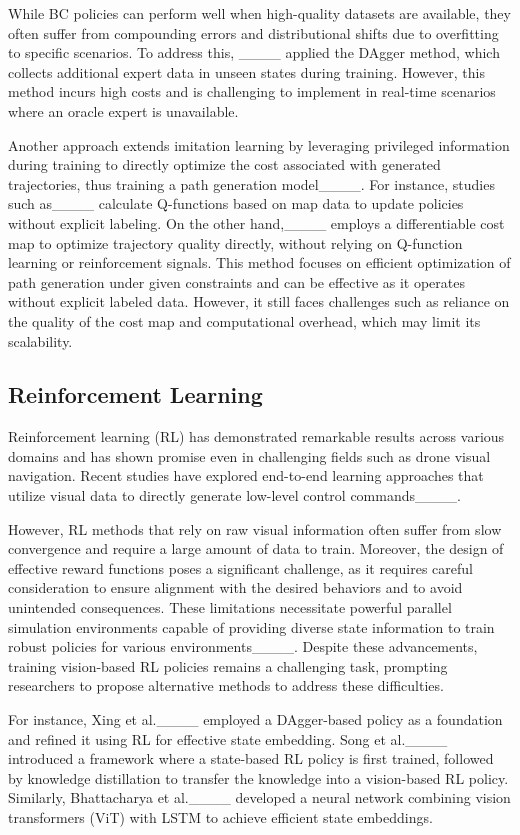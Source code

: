 While BC policies can perform well when high-quality datasets are available, they often suffer from compounding errors and distributional shifts due to overfitting to specific scenarios. To address this, ____ applied the DAgger method, which collects additional expert data in unseen states during training. However, this method incurs high costs and is challenging to implement in real-time scenarios where an oracle expert is unavailable.

Another approach extends imitation learning by leveraging privileged information during training to directly optimize the cost associated with generated trajectories, thus training a path generation model____. For instance, studies such as____ calculate Q-functions based on map data to update policies without explicit labeling. On the other hand,____ employs a differentiable cost map to optimize trajectory quality directly, without relying on Q-function learning or reinforcement signals. This method focuses on efficient optimization of path generation under given constraints and can be effective as it operates without explicit labeled data. However, it still faces challenges such as reliance on the quality of the cost map and computational overhead, which may limit its scalability.

\subsection{Reinforcement Learning}
Reinforcement learning (RL) has demonstrated remarkable results across various domains and has shown promise even in challenging fields such as drone visual navigation. Recent studies have explored end-to-end learning approaches that utilize visual data to directly generate low-level control commands____.

However, RL methods that rely on raw visual information often suffer from slow convergence and require a large amount of data to train. Moreover, the design of effective reward functions poses a significant challenge, as it requires careful consideration to ensure alignment with the desired behaviors and to avoid unintended consequences. These limitations necessitate powerful parallel simulation environments capable of providing diverse state information to train robust policies for various environments____. Despite these advancements, training vision-based RL policies remains a challenging task, prompting researchers to propose alternative methods to address these difficulties.

For instance, Xing et al.____ employed a DAgger-based policy as a foundation and refined it using RL for effective state embedding. Song et al.____ introduced a framework where a state-based RL policy is first trained, followed by knowledge distillation to transfer the knowledge into a vision-based RL policy. Similarly, Bhattacharya et al.____ developed a neural network combining vision transformers (ViT) with LSTM to achieve efficient state embeddings.


